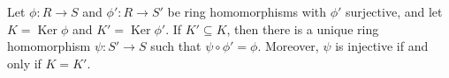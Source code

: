 Let $\phi: R \to S$ and $\phi': R \to S'$ be ring homomorphisms with $\phi'$ surjective, and let $K = \operatorname{Ker} \phi$ and $K' = \operatorname{Ker} \phi'$. If $K' \subseteq K$, then there is a unique ring homomorphism $\psi: S' \to S$ such that $\psi \circ \phi' = \phi$. Moreover, $\psi$ is injective if and only if $K = K'$.
